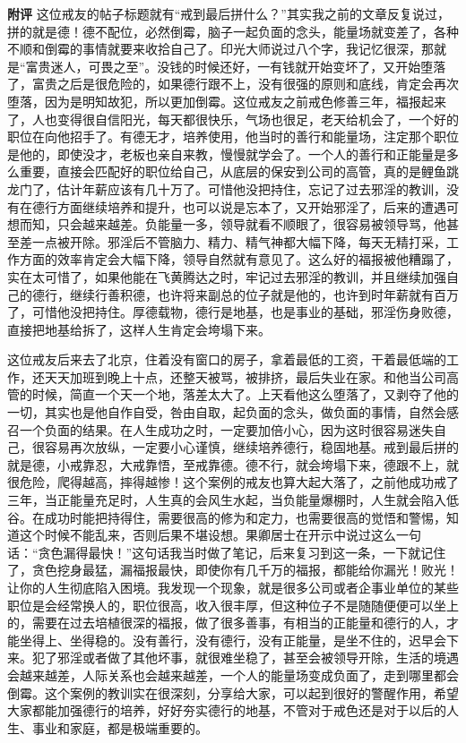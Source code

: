\begin{case}
    \textbf{附评} 这位戒友的帖子标题就有“戒到最后拼什么？”其实我之前的文章反复说过，拼的就是德！德不配位，必然倒霉，脑子一起负面的念头，能量场就变差了，各种不顺和倒霉的事情就要来收拾自己了。印光大师说过八个字，我记忆很深，那就是“富贵迷人，可畏之至”。没钱的时候还好，一有钱就开始变坏了，又开始堕落了，富贵之后是很危险的，如果德行跟不上，没有很强的原则和底线，肯定会再次堕落，因为是明知故犯，所以更加倒霉。这位戒友之前戒色修善三年，福报起来了，人也变得很自信阳光，每天都很快乐，气场也很足，老天给机会了，一个好的职位在向他招手了。有德无才，培养使用，他当时的善行和能量场，注定那个职位是他的，即使没才，老板也亲自来教，慢慢就学会了。一个人的善行和正能量是多么重要，直接会匹配好的职位给自己，从底层的保安到公司的高管，真的是鲤鱼跳龙门了，估计年薪应该有几十万了。可惜他没把持住，忘记了过去邪淫的教训，没有在德行方面继续培养和提升，也可以说是忘本了，又开始邪淫了，后来的遭遇可想而知，只会越来越差。负能量一多，领导就看不顺眼了，很容易被领导骂，他甚至差一点被开除。邪淫后不管脑力、精力、精气神都大幅下降，每天无精打采，工作方面的效率肯定会大幅下降，领导自然就有意见了。这么好的福报被他糟蹋了，实在太可惜了，如果他能在飞黄腾达之时，牢记过去邪淫的教训，并且继续加强自己的德行，继续行善积德，也许将来副总的位子就是他的，也许到时年薪就有百万了，可惜他没把持住。厚德载物，德行是地基，也是事业的基础，邪淫伤身败德，直接把地基给拆了，这样人生肯定会垮塌下来。

    这位戒友后来去了北京，住着没有窗口的房子，拿着最低的工资，干着最低端的工作，还天天加班到晚上十点，还整天被骂，被排挤，最后失业在家。和他当公司高管的时候，简直一个天一个地，落差太大了。上天看他这么堕落了，又剥夺了他的一切，其实也是他自作自受，咎由自取，起负面的念头，做负面的事情，自然会感召一个负面的结果。在人生成功之时，一定要加倍小心，因为这时很容易迷失自己，很容易再次放纵，一定要小心谨慎，继续培养德行，稳固地基。戒到最后拼的就是德，小戒靠忍，大戒靠悟，至戒靠德。德不行，就会垮塌下来，德跟不上，就很危险，爬得越高，摔得越惨！这个案例的戒友也算大起大落了，之前他成功戒了三年，当正能量充足时，人生真的会风生水起，当负能量爆棚时，人生就会陷入低谷。在成功时能把持得住，需要很高的修为和定力，也需要很高的觉悟和警惕，知道这个时候不能乱来，否则后果不堪设想。果卿居士在开示中说过这么一句话：“贪色漏得最快！”这句话我当时做了笔记，后来复习到这一条，一下就记住了，贪色挖身最猛，漏福报最快，即使你有几千万的福报，都能给你漏光！败光！让你的人生彻底陷入困境。我发现一个现象，就是很多公司或者企事业单位的某些职位是会经常换人的，职位很高，收入很丰厚，但这种位子不是随随便便可以坐上的，需要在过去培植很深的福报，做了很多善事，有相当的正能量和德行的人，才能坐得上、坐得稳的。没有善行，没有德行，没有正能量，是坐不住的，迟早会下来。犯了邪淫或者做了其他坏事，就很难坐稳了，甚至会被领导开除，生活的境遇会越来越差，人际关系也会越来越差，一个人的能量场变成负面了，走到哪里都会倒霉。这个案例的教训实在很深刻，分享给大家，可以起到很好的警醒作用，希望大家都能加强德行的培养，好好夯实德行的地基，不管对于戒色还是对于以后的人生、事业和家庭，都是极端重要的。


\end{case}
